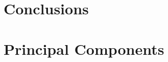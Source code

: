 \documentclass[english, oneside]{HYgradu}
\begin{document}
\chapter{Conclusions}






\clearpage
{} %



\newpage
\appendix
\chapter{Principal Components}
\end{document}
